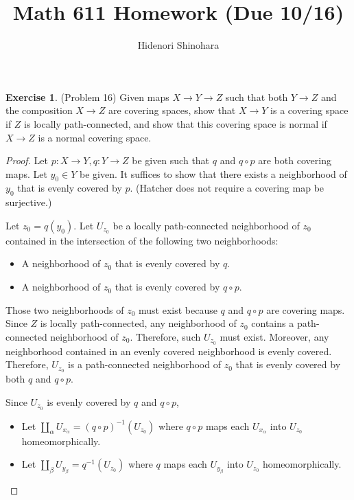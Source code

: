 \documentclass[12pt, psamsfonts]{amsart}
\theoremstyle{definition}
\newtheorem*{exer}{Exercise}
\theoremstyle{remark}
\numberwithin{equation}{section}
\begin{document}
\title{Math 611 Homework (Due 10/16)}
\author{Hidenori Shinohara}
\maketitle

\begin{exer}{(Problem 16)}
  Given maps $X \rightarrow Y \rightarrow Z$ such that both $Y \rightarrow Z$ and the composition $X \rightarrow Z$ are covering spaces, show that $X \rightarrow Y$ is a covering space if $Z$ is locally path-connected, and show that this covering space is normal if $X \rightarrow Z$ is a normal covering space.
\end{exer}

\begin{proof}
  Let $p: X \rightarrow Y, q: Y \rightarrow Z$ be given such that $q$ and $q \circ p$ are both covering maps.
  Let $y_0 \in Y$ be given.
  It suffices to show that there exists a neighborhood of $y_0$ that is evenly covered by $p$.
  (Hatcher does not require a covering map be surjective.)

  Let $z_0 = q(y_0)$.
  Let $U_{z_0}$ be a locally path-connected neighborhood of $z_0$ contained in the intersection of the following two neighborhoods:
  \begin{itemize}
    \item
      A neighborhood of $z_0$ that is evenly covered by $q$.
    \item
      A neighborhood of $z_0$ that is evenly covered by $q \circ p$.
  \end{itemize}

  Those two neighborhoods of $z_0$ must exist because $q$ and $q \circ p$ are covering maps.
  Since $Z$ is locally path-connected, any neighborhood of $z_0$ contains a path-connected neighborhood of $z_0$.
  Therefore, such $U_{z_0}$ must exist.
  Moreover, any neighborhood contained in an evenly covered neighborhood is evenly covered.
  Therefore, $U_{z_0}$ is a path-connected neighborhood of $z_0$ that is evenly covered by both $q$ and $q \circ p$.

  Since $U_{z_0}$ is evenly covered by $q$ and $q \circ p$,
  \begin{itemize}
    \item
      Let $\coprod_{\alpha} U_{x_{\alpha}} = (q \circ p)^{-1}(U_{z_0})$ where $q \circ p$ maps each $U_{x_{\alpha}}$ into $U_{z_0}$ homeomorphically.
    \item
      Let $\coprod_{\beta} U_{y_{\beta}} = q^{-1}(U_{z_0})$ where $q$ maps each $U_{y_{\beta}}$ into $U_{z_0}$ homeomorphically.
  \end{itemize}


\end{proof}
\end{document}
